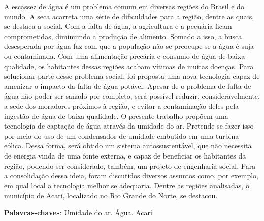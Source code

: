 \begin{resumo}
 
 A escassez de água é um problema comum em diversas regiões do Brasil e do mundo. A seca acarreta uma série de dificuldades 
 para a região, dentre as quais, se destaca a social. Com a falta  de água, a agricultura e a pecuária ficam comprometidas,
 diminuindo a produção de alimento. Somado a isso, a busca desesperada por água faz com que a população não se preocupe se a 
 água é suja ou contaminada. Com uma alimentação precária e consumo de água de baixa qualidade, os habitantes dessas regiões
 acabam vítimas de muitas doenças. Para solucionar parte desse problema social, foi proposta uma nova tecnologia capaz de
 amenizar o impacto da falta de água potável. Apesar de o problema de falta de água não poder ser sanado por completo, 
 será possível reduzir, consideravelmente, a sede dos moradores próximos à região, e evitar a contaminação deles pela 
 ingestão de água de baixa qualidade. O presente trabalho propõem uma tecnologia de captação de água através da umidade
 do ar. Pretende-se fazer isso por meio do uso de um condensador de umidade embutido em uma turbina eólica. Dessa forma,
 será obtido um sistema autossustentável, que não necessita de energia vinda de uma fonte externa, e capaz de beneficiar
 os habitantes da região, podendo ser considerado, também, um projeto de engenharia social. Para a consolidação dessa ideia,
 foram discutidos diversos assuntos como, por exemplo, em qual local a tecnologia melhor se adequaria. Dentre as regiões
 analisadas, o município de Acari, localizado no Rio Grande do Norte, se destacou.

 \vspace{\onelineskip}
    
 \noindent
 \textbf{Palavras-chaves}: Umidade do ar. Água. Acarí.
\end{resumo}
